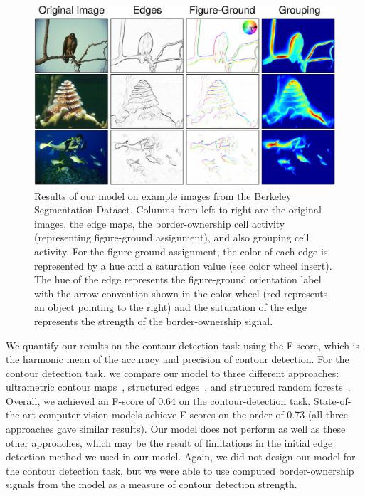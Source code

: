 \begin{figure}[t!]
\centering
\includegraphics[width=\textwidth]{NaturalImage/figs/results_new}
\makeatletter
\let\@currsize\normalsize
\caption[Model results on images from the BSDS dataset]{Results of our model on example images from the Berkeley Segmentation Dataset. Columns from left to right are the original images, the edge maps, the border-ownership cell activity (representing figure-ground assignment), and also grouping cell activity. For the figure-ground assignment, the color of each edge is represented by a hue and a saturation value (see color wheel insert). The hue of the edge represents the figure-ground orientation label with the arrow convention shown in the color wheel (\eg red represents an object pointing to the right) and the saturation of the edge represents the strength of the border-ownership signal.}
\label{Fig:results_summary}
\end{figure}

We quantify our results on the contour detection task using the F-score, which is the harmonic mean of the accuracy and precision of contour detection. For the contour detection task, we compare our model to three different approaches: ultrametric contour maps~\citep[][gPb-owt-ucm]{Arbeleaz_etal11}, structured edges~\citep[][SE]{Dollar_Zitnick15}, and structured random forests~\citep[][SRF]{Teo_etal15}. Overall, we achieved an F-score of 0.64 on the contour-detection task. State-of-the-art computer vision models achieve F-scores on the order of 0.73 (all three approaches gave similar results). Our model does not perform as well as these other approaches, which may be the result of limitations in the initial edge detection method we used in our model. Again, we did not design our model for the contour detection task, but we were able to use computed border-ownership signals from the model as a measure of contour detection strength.

